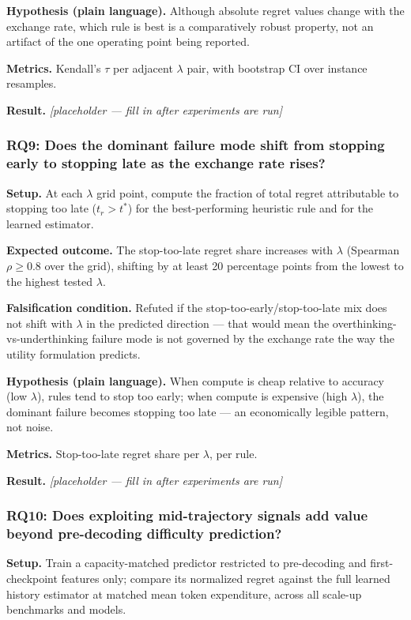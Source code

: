 \documentclass[11pt]{article}
\newcommand{\ph}{\textit{[placeholder --- fill in after experiments are run]}}
\begin{document}
\textbf{Hypothesis (plain language).} Although absolute regret values change with the exchange rate, which rule is best is a comparatively robust property, not an artifact of the one operating point being reported.

\textbf{Metrics.} Kendall's $\tau$ per adjacent $\lambda$ pair, with bootstrap CI over instance resamples.

\textbf{Result.} \ph

\subsubsection{RQ9: Does the dominant failure mode shift from stopping early to stopping late as the exchange rate rises?}
\textbf{Setup.} At each $\lambda$ grid point, compute the fraction of total regret attributable to stopping too late ($t_r > t^*$) for the best-performing heuristic rule and for the learned estimator.

\textbf{Expected outcome.} The stop-too-late regret share increases with $\lambda$ (Spearman $\rho \geq 0.8$ over the grid), shifting by at least 20 percentage points from the lowest to the highest tested $\lambda$.

\textbf{Falsification condition.} Refuted if the stop-too-early/stop-too-late mix does not shift with $\lambda$ in the predicted direction --- that would mean the overthinking-vs-underthinking failure mode is not governed by the exchange rate the way the utility formulation predicts.

\textbf{Hypothesis (plain language).} When compute is cheap relative to accuracy (low $\lambda$), rules tend to stop too early; when compute is expensive (high $\lambda$), the dominant failure becomes stopping too late --- an economically legible pattern, not noise.

\textbf{Metrics.} Stop-too-late regret share per $\lambda$, per rule.

\textbf{Result.} \ph

\subsubsection{RQ10: Does exploiting mid-trajectory signals add value beyond pre-decoding difficulty prediction?}
\textbf{Setup.} Train a capacity-matched predictor restricted to pre-decoding and first-checkpoint features only; compare its normalized regret against the full learned history estimator at matched mean token expenditure, across all scale-up benchmarks and models.
\end{document}
